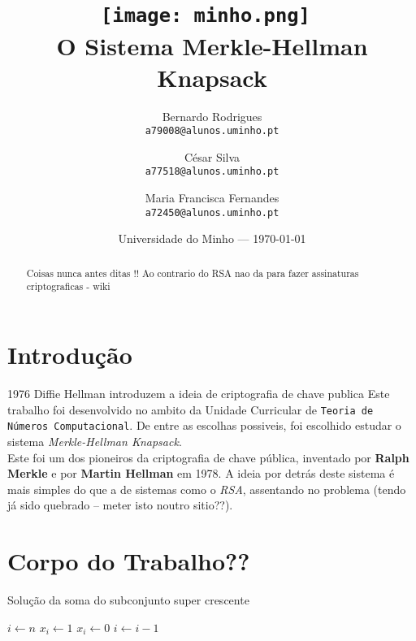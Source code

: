 \documentclass[11pt]{report}
\begin{document}
\title{\texttt{[image: minho.png]}~\\[1cm] O Sistema Merkle-Hellman Knapsack}

\author{Bernardo Rodrigues\\ \texttt{a79008@alunos.uminho.pt}\\ \and César Silva\\ \texttt{a77518@alunos.uminho.pt}\\ \and Maria Francisca Fernandes\\ \texttt{a72450@alunos.uminho.pt}\\}

\date{Universidade do Minho --- \today}

\maketitle

\tableofcontents

\begin{abstract}

	Coisas nunca antes ditas !!
	Ao contrario do RSA nao da para fazer assinaturas criptograficas - wiki

\end{abstract}

\chapter{Introdução}


1976 Diffie Hellman introduzem a ideia de criptografia de chave publica
Este trabalho foi desenvolvido no ambito da Unidade Curricular de \texttt{Teoria de Números Computacional}. De entre as escolhas possiveis, foi escolhido estudar o sistema \textit{Merkle-Hellman Knapsack}. \\
Este foi um dos pioneiros da criptografia de chave pública, inventado por \textbf{Ralph Merkle} e por \textbf{Martin Hellman} em 1978.
A ideia por detrás deste sistema é mais simples do que a de sistemas como o \textit{RSA}, assentando no problema  (tendo já sido quebrado -- meter isto noutro sitio??).

\chapter{Corpo do Trabalho??}

\begin{algorithm}
	\caption{Solução da soma do subconjunto super crescente}
	\begin{algorithmic}[1]
		\State $i \gets n$
				\State $x_i \gets 1$
			\Else
				\State $x_i \gets 0 $
			\EndIf
		\State $i \gets i - 1$
		\EndWhile
\end{algorithmic}
\end{algorithm}
\end{document}
